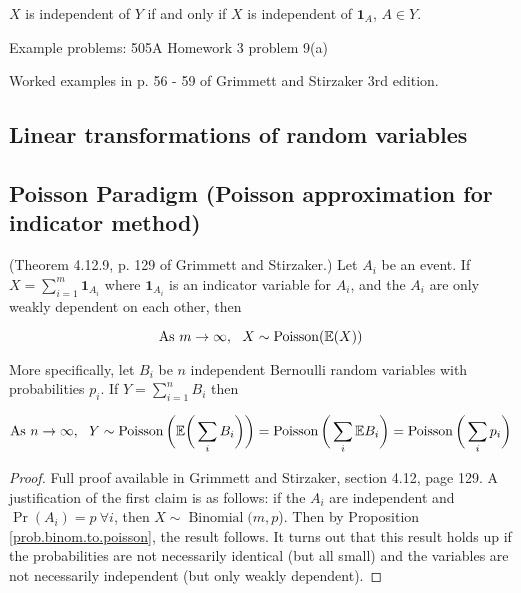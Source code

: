 \begin{theorem} \(X\) is independent of \(Y\) if and only if \(X\) is independent of \(\boldsymbol{1}_A\), \(A \in Y\). \end{theorem}

Example problems: 505A Homework 3 problem 9(a)

Worked examples in p. 56 - 59 of Grimmett and Stirzaker 3rd edition.

\subsection{Linear transformations of random variables}

\subsection{Poisson Paradigm (Poisson approximation for indicator method)}\label{prob.poisson.paradigm}

\begin{theorem} (Theorem 4.12.9, p. 129 of Grimmett and Stirzaker.) Let \(A_i\) be an event. If \(X = \sum_{i=1}^m \boldsymbol{1}_{A_i}\) where \(\boldsymbol{1}_{A_i}\) is an indicator variable for \(A_i\), and the \(A_i\) are only weakly dependent on each other, then 

\[
\text{As } m \to \infty, \ \ X \sim \operatorname{Poisson}(\mathbb{E}(X))
\]

More specifically, let \(B_i\) be \(n\) independent Bernoulli random variables with probabilities \(p_i\). If \(Y = \sum_{i=1}^n B_i\) then 

\[
\text{As } n \to \infty, \ \ Y \sim \operatorname{Poisson} \bigg(\mathbb{E} \bigg(\sum_i B_i \bigg) \bigg) = \operatorname{Poisson}\bigg(\sum_i \mathbb{E} B_i \bigg) = \operatorname{Poisson}\bigg(\sum_i p_i \bigg) 
\]

\end{theorem}

\begin{proof}
Full proof available in Grimmett and Stirzaker, section 4.12, page 129. A justification of the first claim is as follows: if the \(A_i\) are independent and \(\Pr(A_i) = p \ \forall i\), then \(X \sim \operatorname{Binomial}(m, p\)). Then by Proposition \ref{prob.binom.to.poisson}, the result follows. It turns out that this result holds up if the probabilities are not necessarily identical (but all small) and the variables are not necessarily independent (but only weakly dependent).
\end{proof}

